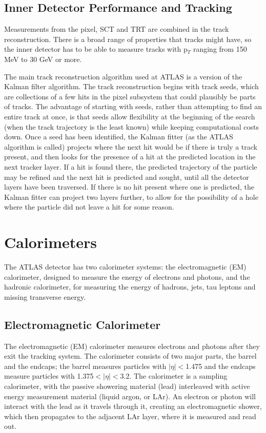  
\subsection{Inner Detector Performance and Tracking}
Measurements from the pixel, SCT and TRT are combined in the track reconstruction.  There is a broad range of properties that tracks might have, so the inner detector has to be able to measure tracks with p$_T$ ranging from 150 MeV to 30 GeV or more.   

The main track reconstruction algorithm used at ATLAS is a version of the Kalman filter algorithm.  The track reconstruction begins with track seeds, which are collections of a few hits in the pixel subsystem that could plausibly be parts of tracks.  The advantage of starting with seeds, rather than attempting to find an entire track at once, is that seeds allow flexibility at the beginning of the search (when the track trajectory is the least known) while keeping computational costs down.  Once a seed has been identified, the Kalman fitter (as the ATLAS algorithm is called) projects where the next hit would be if there is truly a track present, and then looks for the presence of a hit at the predicted location in the next tracker layer.  If a hit is found there, the predicted trajectory of the particle may be refined and the next hit is predicted and sought, until all the detector layers have been traversed. If there is no hit present where one is predicted, the Kalman fitter can project two layers further, to allow for the possibility of a hole where the particle did not leave a hit for some reason. 

\section{Calorimeters}
The ATLAS detector has two calorimeter systems: the electromagnetic (EM) calorimeter, designed to measure the energy of electrons and photons, and the hadronic calorimeter, for measuring the energy of hadrons, jets, tau leptons and missing transverse energy.  

\subsection{Electromagnetic Calorimeter}
The electromagnetic (EM) calorimeter measures electrons and photons after they exit the tracking system.  The calorimeter consists of two major parts, the barrel and the endcaps; the barrel measures particles with $|\eta|<$1.475 and the endcaps measure particles with 1.375$<|\eta|<$3.2.  The calorimeter is a sampling calorimeter, with the passive showering material (lead) interleaved with active energy measurement material (liquid argon, or LAr).  An electron or photon will interact with the lead as it travels through it, creating an electromagnetic shower, which then propagates to the adjacent LAr layer, where it is measured and read out.

